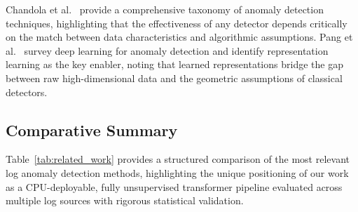 \documentclass[conference]{IEEEtran}
\begin{document}
Chandola et al.~\cite{chandola2009} provide a comprehensive taxonomy of
anomaly detection techniques, highlighting that the effectiveness of any
detector depends critically on the match between data characteristics and
algorithmic assumptions.  Pang et al.~\cite{pang2021} survey deep learning
for anomaly detection and identify representation learning as the key
enabler, noting that learned representations bridge the gap between raw
high-dimensional data and the geometric assumptions of classical detectors.

\subsection{Comparative Summary}

Table~\ref{tab:related_work} provides a structured comparison of the most
relevant log anomaly detection methods, highlighting the unique positioning
of our work as a CPU-deployable, fully unsupervised transformer pipeline
evaluated across multiple log sources with rigorous statistical validation.
\end{document}

